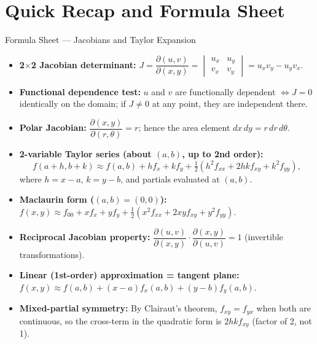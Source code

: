 \documentclass[12pt,a4paper]{article}
\begin{document}
\section{Quick Recap and Formula Sheet}

\begin{learnbox}{Formula Sheet --- Jacobians and Taylor Expansion}
\begin{itemize}[leftmargin=*]
  \item \textbf{2$\times$2 Jacobian determinant:}
    \( J = \dfrac{\partial(u,v)}{\partial(x,y)} =
    \begin{vmatrix} u_x & u_y \\ v_x & v_y \end{vmatrix}
    = u_x v_y - u_y v_x. \)
  \item \textbf{Functional dependence test:} \( u \) and \( v \) are functionally dependent \( \iff J = 0 \) identically on the domain; if \( J \neq 0 \) at any point, they are independent there.
  \item \textbf{Polar Jacobian:} \( \dfrac{\partial(x,y)}{\partial(r,\theta)} = r \); hence the area element \( dx\,dy = r\,dr\,d\theta \).
  \item \textbf{2-variable Taylor series (about \( (a,b) \), up to 2nd order):}
    \[
      f(a+h,b+k) \approx f(a,b) + hf_x + kf_y + \tfrac{1}{2}(h^2 f_{xx} + 2hkf_{xy} + k^2 f_{yy}),
    \]
    where \( h = x-a \), \( k = y-b \), and partials evaluated at \( (a,b) \).
  \item \textbf{Maclaurin form (\( (a,b) = (0,0) \)):}
    \( f(x,y) \approx f_{00} + xf_x + yf_y + \tfrac{1}{2}(x^2 f_{xx}+2xyf_{xy}+y^2 f_{yy}) \).
  \item \textbf{Reciprocal Jacobian property:}
    \( \dfrac{\partial(u,v)}{\partial(x,y)} \cdot \dfrac{\partial(x,y)}{\partial(u,v)} = 1 \) (invertible transformations).
  \item \textbf{Linear (1st-order) approximation = tangent plane:}
    \( f(x,y) \approx f(a,b) + (x-a)f_x(a,b) + (y-b)f_y(a,b). \)
  \item \textbf{Mixed-partial symmetry:} By Clairaut's theorem, \( f_{xy} = f_{yx} \) when both are continuous, so the cross-term in the quadratic form is \( 2hkf_{xy} \) (factor of 2, not 1).
\end{itemize}
\end{learnbox}
\end{document}
